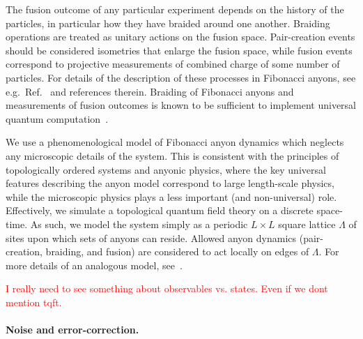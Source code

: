 \documentclass[aps, prl, letterpaper, twocolumn, superscriptaddress, notitlepage, 10pt]{revtex4-1}
\newcommand{\dude}[1]{\textcolor{red}{#1}}
\begin{document}
The fusion outcome of any particular experiment depends on the history of the particles, in 
particular how they have braided around one another. Braiding operations are treated as 
unitary actions on the fusion space. Pair-creation events should be considered isometries 
that enlarge the fusion space, while fusion events correspond to projective measurements 
of combined charge of some number of particles. For details of the description of these 
processes in Fibonacci anyons, see e.g.~Ref.~\cite{Nayak2008} and references therein. 
Braiding of Fibonacci anyons and measurements of fusion outcomes is known to be 
sufficient to implement universal quantum computation~\cite{Freedman2002, Nayak2008}.

We use a phenomenological model of Fibonacci anyon dynamics which neglects any 
microscopic details of the system. 
This is consistent with the principles of topologically 
ordered systems and anyonic physics, where the key universal features describing the 
anyon model correspond to large length-scale physics, while the microscopic physics plays 
a less important (and non-universal) role. Effectively, we simulate a topological quantum field theory on a discrete space-time.
As such, we model the system simply as a 
periodic $L\times L$ square lattice $\Lambda$ of sites upon which sets of anyons can 
reside. Allowed anyon dynamics (pair-creation, braiding, and fusion) are considered to act 
locally on edges of $\Lambda$. For more details of an analogous model, see~\cite{Brell2013}.

\dude{I really need to see something about observables vs. states. Even if
we dont mention tqft.}

\paragraph{Noise and error-correction.}
\end{document}
